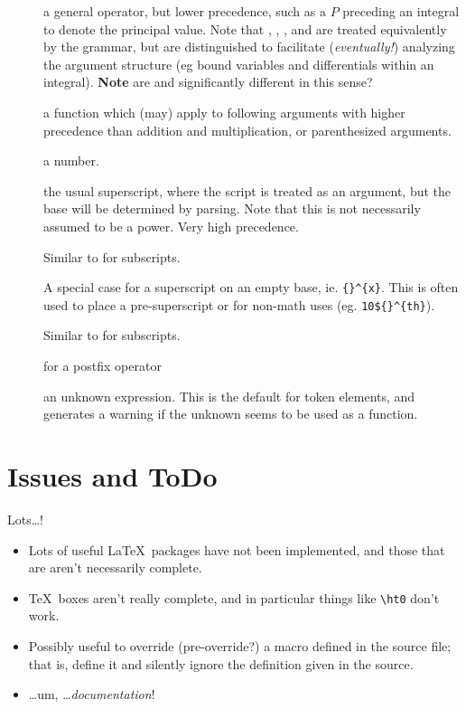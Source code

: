 \documentclass{article}
\begin{document}
\begin{description}
\item[] a general operator, but lower precedence, such as a $P$ preceding
  an integral to denote the principal value.
 Note that , , ,  and  are treated
 equivalently by the grammar, but are distinguished to facilitate (\emph{eventually!}) 
 analyzing the argument structure (eg bound variables and differentials within an integral).
 \textbf{Note} are  and  significantly different in this sense?
\item[]
\item[] a function which (may) apply to following arguments with higher
   precedence than addition and multiplication, or parenthesized arguments.
\item[] a number.
\item[] the usual superscript, where the script is treated as
  an argument, but the base will be determined by parsing. Note that this is not
  necessarily assumed to be a power. Very high precedence.
\item[] Similar to  for subscripts.
\item[] A special case for a superscript on an empty base,
  ie. \verb|{}^{x}|.  This is often used to place a pre-superscript or for
  non-math uses (eg. \verb|10${}^{th}|).
\item[] Similar to  for subscripts.
\item[] for a postfix operator
\item[] an unknown expression. This is the default for token elements,
  and generates a warning if the unknown seems to be used as a function.
\end{description}

\section{Issues and ToDo}\label{app:todo}
Lots\ldots!
\begin{itemize}
\item Lots of useful \LaTeX\ packages have not been implemented, and those
  that are aren't necessarily complete.
\item \TeX\ boxes aren't really complete, and in particular things like \verb|\ht0|
  don't work.
\item Possibly useful to override (pre-override?) a macro defined in the source file;
  that is, define it and silently ignore the definition given in the source.
\item \ldots um, \ldots \emph{documentation}!
\end{itemize}
\end{document}
